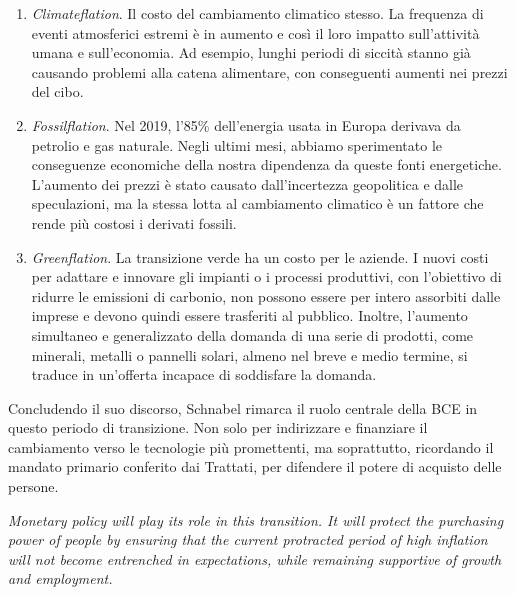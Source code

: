 \begin{enumerate}

\item \textit{Climateflation}. Il costo del cambiamento climatico stesso. La frequenza di eventi atmosferici estremi è in aumento e così il loro impatto sull'attività umana e sull'economia. Ad esempio, lunghi periodi di siccità stanno già causando problemi alla catena alimentare, con conseguenti aumenti nei prezzi del cibo.

\item \textit{Fossilflation}. Nel 2019, l'85\% dell'energia usata in Europa derivava da petrolio e gas naturale. Negli ultimi mesi, abbiamo sperimentato le conseguenze economiche della nostra dipendenza da queste fonti energetiche. L'aumento dei prezzi è stato causato dall'incertezza geopolitica e dalle speculazioni, ma la stessa lotta al cambiamento climatico è un fattore che rende più costosi i derivati fossili.

\item \textit{Greenflation}. La transizione verde ha un costo per le aziende. I nuovi costi per adattare e innovare gli impianti o i processi produttivi, con l'obiettivo di ridurre le emissioni di carbonio, non possono essere per intero assorbiti dalle imprese e devono quindi essere trasferiti al pubblico. Inoltre, l'aumento simultaneo e generalizzato della domanda di una serie di prodotti, come minerali, metalli o pannelli solari, almeno nel breve e medio termine, si traduce in un'offerta incapace di soddisfare la domanda.

\end{enumerate}

Concludendo il suo discorso, Schnabel rimarca il ruolo centrale della BCE in questo periodo di transizione. Non solo per indirizzare e finanziare il cambiamento verso le tecnologie più promettenti, ma soprattutto, ricordando il mandato primario conferito dai Trattati, per difendere il potere di acquisto delle persone.

\begin{displayquote}
	\small\singlespacing\textit{Monetary policy will play its role in this transition. It will protect the purchasing power of people by ensuring that the current protracted period of high inflation will not become entrenched in expectations, while remaining supportive of growth and employment.}\\ \parencite{ECB:speech_isabel}
\end{displayquote}

















